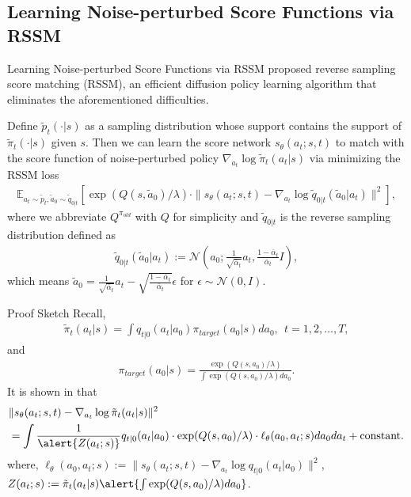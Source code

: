 \documentclass[aspectratio=169,xcolor=dvipsnames]{beamer}
\newcommand{\bE}{\mathbb{E}}
\newcommand{\lm}{\lambda}
\newcommand{\te}{\theta}
\newcommand{\eps}{\epsilon}
\newcommand{\nal}[1]{\begin{align*}#1\end{align*}}
\newcommand{\al}[1]{\begin{align}#1\end{align}}
\newcommand{\cN}{\mathcal{N}}
\begin{document}
\subsection{Learning Noise-perturbed Score Functions via RSSM}
\begin{frame}{Learning Noise-perturbed Score Functions via RSSM}
 \cite{ma2025soft} proposed reverse sampling score matching (RSSM), an efficient
 diffusion policy learning algorithm that eliminates the aforementioned difficulties. 
    \begin{theorem}
        Define $\tilde{p}_t(\cdot|s)$ as a sampling distribution whose support contains the support of $\tilde{\pi}_t(\cdot|s)$ given $s$. Then we can learn the score network $s_{\te}(a_t;s,t)$ to match with the score function of noise-perturbed policy $\nabla_{a_t}\log \tilde{\pi}_t(a_t|s)$ via minimizing the RSSM loss
        \al{
            \bE_{a_t\sim \tilde{p}_t, \tilde{a}_0\sim \tilde{q}_{0|t}}\left[\exp(Q(s,\tilde{a}_0)/\lm)\cdot\|s_{\te}(a_t;s,t)-\nabla_{a_t}\log \tilde{q}_{0|t}(\tilde{a}_0|a_t)\|^2\right], \label{eq:10}
        }
        where we abbreviate $Q^{\pi_{old}}$ with $Q$ for simplicity and $\tilde{q}_{0|t}$ is the reverse sampling distribution defined as
        \al{
            \tilde{q}_{0|t}(\tilde{a}_0|a_t):=\cN\left(a_0;\frac{1}{\sqrt{\bar{\alpha}_t}}a_t,\frac{1-\bar{\alpha}_t}{\bar{\alpha}_t}I\right), \label{eq:11}
        }
        which means $\tilde{a}_0 = \frac{1}{\sqrt{\bar{\alpha}_t}}a_t - \sqrt{\frac{1-\bar{\alpha}_t}{\bar{\alpha}_t}} \eps$ for $\eps \sim \cN(0,I)$.
    \end{theorem}
\end{frame}
\begin{frame}{Proof Sketch}
    Recall,
    \nal{
        \tilde{\pi}_t(a_t|s) = \int q_{t|0}(a_t|a_0)\pi_{target}(a_0|s)da_0, ~~t=1,2,\ldots,T,
    }
    and
    \nal{
        \pi_{target}(a_0|s)=\frac{\exp(Q(s,a_0)/\lm)}{\int \exp(Q(s,a_0)/\lm) da_0}.
    }
    It is shown in \cite{ma2025soft} that
    \al{
        & \|s_{\te}(a_t;s,t)-\nabla_{a_t}\log\tilde{\pi}_t(a_t|s)\|^2 \notag\\
        & = \int \frac{1}{\alert{Z(a_t;s)}}q_{t|0}(a_t|a_0)\cdot\exp(Q(s,a_0)/\lm)\cdot\ell_{\te}(a_0,a_t;s)da_0 da_t + \text{constant}. \label{eq:12}
    }
    where, $\ell_{\te}(a_0,a_t;s):=\|s_{\te}(a_t;s,t)-\nabla_{a_t}\log q_{t|0}(a_t|a_0)\|^2$, $Z(a_t;s):=\tilde{\pi}_t(a_t|s)\alert{\int \exp(Q(s,a_0)/\lm)da_0}$.
\end{frame}
\end{document}
